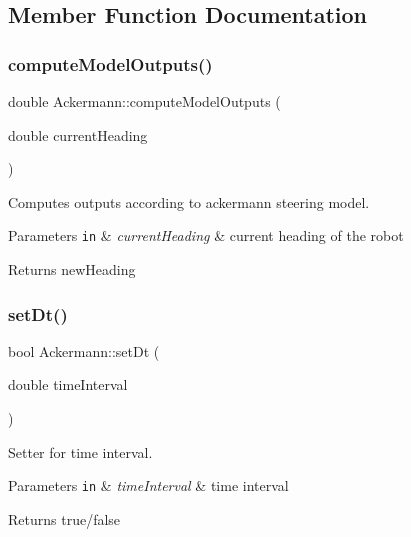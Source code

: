 \subsection{Member Function Documentation}
\mbox{\label{classAckermann_a6d7fa80feb037e7964e2c6b5044df615}} 
\subsubsection{\texorpdfstring{compute\+Model\+Outputs()}{computeModelOutputs()}}
{\footnotesize\ttfamily double Ackermann\+::compute\+Model\+Outputs (\begin{DoxyParamCaption}\item[{double}]{current\+Heading }\end{DoxyParamCaption})}



Computes outputs according to ackermann steering model. 


\begin{DoxyParams}[1]{Parameters}
\mbox{\tt in}  & {\em current\+Heading} & current heading of the robot \\
\hline
\end{DoxyParams}
\begin{DoxyReturn}{Returns}
new\+Heading 
\end{DoxyReturn}
\mbox{\label{classAckermann_ac849806d5f7fa705afd1691d0e1564ab}} 
\subsubsection{\texorpdfstring{set\+Dt()}{setDt()}}
{\footnotesize\ttfamily bool Ackermann\+::set\+Dt (\begin{DoxyParamCaption}\item[{double}]{time\+Interval }\end{DoxyParamCaption})}



Setter for time interval. 


\begin{DoxyParams}[1]{Parameters}
\mbox{\tt in}  & {\em time\+Interval} & time interval \\
\hline
\end{DoxyParams}
\begin{DoxyReturn}{Returns}
true/false 
\end{DoxyReturn}
\mbox{\label{classAckermann_a70edfb9472f629092736004586a5b3ce}} 
